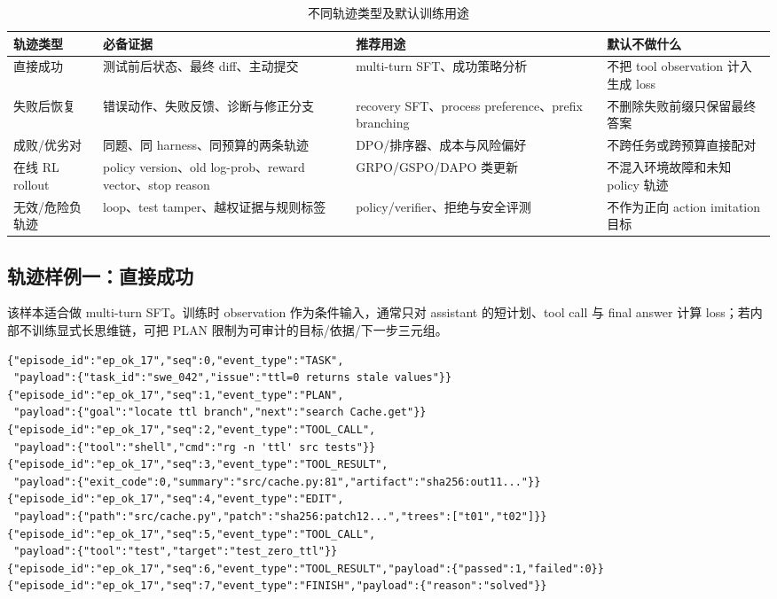 \documentclass[10pt,a4paper,UTF8,fontset=none]{ctexart}
\newcommand{\ident}[1]{{\rmfamily #1}}
\begin{document}
\begin{table}[htbp]
\centering
\caption{不同轨迹类型及默认训练用途}
\label{zh:tab:trajectory-usage}
\small
\begin{tabularx}{\textwidth}{p{2.5cm}p{4.5cm}YY}
\toprule
轨迹类型 & 必备证据 & 推荐用途 & 默认不做什么 \\
\midrule
直接成功 & 测试前后状态、最终 diff、主动提交 & multi-turn SFT、成功策略分析 & 不把 tool observation 计入生成 loss \\
失败后恢复 & 错误动作、失败反馈、诊断与修正分支 & recovery SFT、process preference、prefix branching & 不删除失败前缀只保留最终答案 \\
成败/优劣对 & 同题、同 harness、同预算的两条轨迹 & DPO/排序器、成本与风险偏好 & 不跨任务或跨预算直接配对 \\
在线 RL rollout & policy version、old log-prob、reward vector、stop reason & GRPO/GSPO/DAPO 类更新 & 不混入环境故障和未知 policy 轨迹 \\
无效/危险负轨迹 & loop、test tamper、越权证据与规则标签 & policy/verifier、拒绝与安全评测 & 不作为正向 action imitation 目标 \\
\bottomrule
\end{tabularx}
\end{table}

\subsection{轨迹样例一：直接成功}

该样本适合做 multi-turn SFT。训练时 observation 作为条件输入，通常只对 assistant 的短计划、tool call 与 final answer 计算 loss；若内部不训练显式长思维链，可把 \ident{PLAN} 限制为可审计的目标/依据/下一步三元组。

\begin{lstlisting}[style=codeblock,basicstyle=\fontsize{7.6}{8.6}\selectfont\ttfamily,framesep=5pt,caption={搜索--编辑--测试--提交的成功轨迹（JSONL）},label={zh:lst:trajectory-success}]
{"episode_id":"ep_ok_17","seq":0,"event_type":"TASK",
 "payload":{"task_id":"swe_042","issue":"ttl=0 returns stale values"}}
{"episode_id":"ep_ok_17","seq":1,"event_type":"PLAN",
 "payload":{"goal":"locate ttl branch","next":"search Cache.get"}}
{"episode_id":"ep_ok_17","seq":2,"event_type":"TOOL_CALL",
 "payload":{"tool":"shell","cmd":"rg -n 'ttl' src tests"}}
{"episode_id":"ep_ok_17","seq":3,"event_type":"TOOL_RESULT",
 "payload":{"exit_code":0,"summary":"src/cache.py:81","artifact":"sha256:out11..."}}
{"episode_id":"ep_ok_17","seq":4,"event_type":"EDIT",
 "payload":{"path":"src/cache.py","patch":"sha256:patch12...","trees":["t01","t02"]}}
{"episode_id":"ep_ok_17","seq":5,"event_type":"TOOL_CALL",
 "payload":{"tool":"test","target":"test_zero_ttl"}}
{"episode_id":"ep_ok_17","seq":6,"event_type":"TOOL_RESULT","payload":{"passed":1,"failed":0}}
{"episode_id":"ep_ok_17","seq":7,"event_type":"FINISH","payload":{"reason":"solved"}}
\end{lstlisting}
\end{document}
